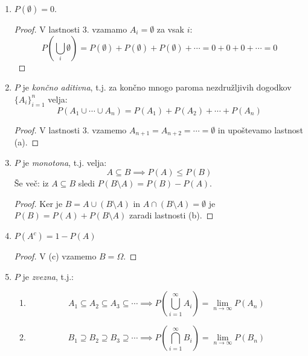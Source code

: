 \documentclass[12pt]{book}
\theoremstyle{definition}
\theoremstyle{plain}
\theoremstyle{plain}
\theoremstyle{plain}
\theoremstyle{remark}
\begin{document}
\begin{enumerate}[label=(\alph*)]
    \item $P(\emptyset) = 0$. 
    \begin{proof}
        V lastnosti 3. vzamamo $A_i = \emptyset$ za vsak $i$: 
        $$
        P\left(\bigcup_i \emptyset\right)=P(\emptyset)+P(\emptyset)+P(\emptyset)+\cdots = 0+0+0+ \cdots = 0
        $$
    \end{proof}
    \item $P$ je \emph{končno aditivna}, t.j. za končno mnogo paroma nezdružljivih dogodkov $\{A_i\}_{i=1}^{n}$ velja: 
    $$
    P\left(A_1 \cup \cdots \cup A_n\right)=P\left(A_1\right)+P\left(A_2\right)+\cdots+P\left(A_n\right)
    $$
    \begin{proof}
        V lastnosti 3. vzamemo $A_{n+1}=A_{n+2}=\cdots=\emptyset$ in upoštevamo lastnost (a). 
    \end{proof}
    \item $P$ je \emph{monotona}, t.j. velja: 
    $$
    A \subseteq B \implies P(A) \leq P(B)
    $$ 
    Še več: iz $A \subseteq B$  sledi $P(B \setminus A)=P(B)-P(A)$.
    \begin{proof}
        Ker je $B=A \cup(B \setminus A)$ in $A \cap(B \setminus A)=\emptyset$ je $P(B)=P(A)+P(B \setminus A)$ zaradi lastnosti (b).
    \end{proof}
    \item $P(A^c) = 1-P(A)$
    \begin{proof}
        V (c) vzamemo $B = \Omega$.
    \end{proof}
    \item $P$ je \emph{zvezna}, t.j.:
    
    \begin{enumerate}[label=(\roman*)]
        \item $$ A_1 \subseteq A_2 \subseteq A_3 \subseteq \cdots \implies P\left(\bigcup_{i=1}^{\infty} A_i\right)=\lim _{n \to \infty} P\left(A_n\right)$$
        \item $$ B_1 \supseteq B_2 \supseteq B_3 \supseteq \cdots \implies P\left(\bigcap_{i=1}^{\infty} B_i\right)=\lim _{n \to \infty} P\left(B_n\right)$$
    \end{enumerate}


\end{enumerate}
\end{document}
